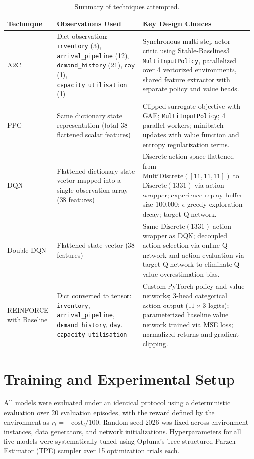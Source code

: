\documentclass[11pt,a4paper]{article}
\begin{document}
\begin{table}[H]
\centering
\small
\begin{tabular}{p{}p{}p{}}
\toprule
\textbf{Technique} & \textbf{Observations Used} & \textbf{Key Design Choices} \\
\midrule
A2C & Dict observation: \texttt{inventory} (3), \texttt{arrival\_pipeline} (12), \texttt{demand\_history} (21), \texttt{day} (1), \texttt{capacity\_utilisation} (1) & Synchronous multi-step actor-critic using Stable-Baselines3 \texttt{MultiInputPolicy}, parallelized over 4 vectorized environments, shared feature extractor with separate policy and value heads. \\
\addlinespace[0.3em]
PPO & Same dictionary state representation (total 38 flattened scalar features) & Clipped surrogate objective with GAE; \texttt{MultiInputPolicy}; 4 parallel workers; minibatch updates with value function and entropy regularization terms. \\
\addlinespace[0.3em]
DQN & Flattened dictionary state vector mapped into a single observation array (38 features) & Discrete action space flattened from $\text{MultiDiscrete}([11, 11, 11])$ to $\text{Discrete}(1331)$ via action wrapper; experience replay buffer size 100,000; $\epsilon$-greedy exploration decay; target Q-network. \\
\addlinespace[0.3em]
Double DQN & Flattened state vector (38 features) & Same $\text{Discrete}(1331)$ action wrapper as DQN; decoupled action selection via online Q-network and action evaluation via target Q-network to eliminate Q-value overestimation bias. \\
\addlinespace[0.3em]
REINFORCE with Baseline & Dict converted to tensor: \texttt{inventory}, \texttt{arrival\_pipeline}, \texttt{demand\_history}, \texttt{day}, \texttt{capacity\_utilisation} & Custom PyTorch policy and value networks; 3-head categorical action output ($11 \times 3$ logits); parameterized baseline value network trained via MSE loss; normalized returns and gradient clipping. \\
\bottomrule
\end{tabular}
\caption{Summary of techniques attempted.}
\end{table}

\section{Training and Experimental Setup}

All models were evaluated under an identical protocol using a deterministic evaluation over 20 evaluation episodes, with the reward defined by the environment as $r_t = -\text{cost}_t / 100$. Random seed 2026 was fixed across environment instances, data generators, and network initializations. Hyperparameters for all five models were systematically tuned using Optuna's Tree-structured Parzen Estimator (TPE) sampler over 15 optimization trials each.
\end{document}

